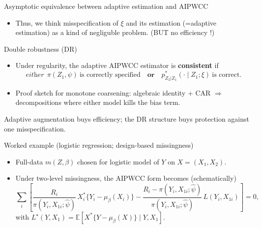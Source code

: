 \documentclass[xcolor=dvipsnames,aspectratio=169]{beamer}
\newcommand{\E}{\mathbb{E}}
\newcommand{\1}{\mathbbm{1}}
\begin{document}
\begin{frame}{Asymptotic equivalence between adaptive estimation and AIPWCC}
  \begin{itemize}
    \begin{tcolorbox}[colframe=Cyan,title=Theorem 10.3]
    Let $\widehat{\beta}_n$ be the estimator obtained by the adaptive estimation, and let $\widehat{\beta}_n^{\ast}$ be the AIPWCC estimator
    . Under suitable regularity conditions,
    \[
      n^{1/2}\!\left(\widehat{\beta}_n-\widehat{\beta}_n^{\ast}\right)\xrightarrow{P}0.
    \]
    Hence, the adaptive estimator is asymptotically equivalent to the
    AIPWCC estimator.
  \end{tcolorbox}
  \item Thus, we think misspecification of $\xi$ and its estimation (=adaptive estimation) as a kind of negliguble problem. (BUT no efficiency !)
  \end{itemize}
\end{frame}

\begin{frame}{Double robustness (DR)}
  \begin{itemize}
    \item Under regularity, the adaptive AIPWCC estimator is \textbf{consistent} if
    \[
      \textit{either}\ \ \pi(Z_1,\psi)\ \text{is correctly specified} \quad \textbf{or}\quad p^\ast_{Z_2|Z_1}(\cdot\mid Z_1;\xi)\ \text{is correct}.
    \]
    \item Proof sketch for monotone coarsening: algebraic identity + CAR $\Rightarrow$ decompositions where either model kills the bias term.
  \end{itemize}
  \begin{tcolorbox}[title=Takeaway]
  Adaptive augmentation buys efficiency; the DR structure buys protection against one misspecification.
  \end{tcolorbox}
\end{frame}

\begin{frame}{Worked example (logistic regression; design-based missingness)}
  \begin{itemize}
    \item Full-data $m(Z,\beta)$ chosen for logistic model of $Y$ on $X=(X_1,X_2)$.
    \item Under two-level missingness, the AIPWCC form becomes (schematically)
    \[
      \sum_i\left[\frac{R_i}{\pi(Y_i,X_{1i};\hat\psi)}\,X^\ast_i\{Y_i-\mu_\beta(X_i)\}
      -\frac{R_i-\pi(Y_i,X_{1i};\hat\psi)}{\pi(Y_i,X_{1i};\hat\psi)}\,L(Y_i,X_{1i})\right]=0,
    \]
    with $L^\star(Y,X_1)=\E\!\left[X^\ast\{Y-\mu_\beta(X)\}\mid Y,X_1\right]$.
  \end{itemize}
\end{frame}
\end{document}
